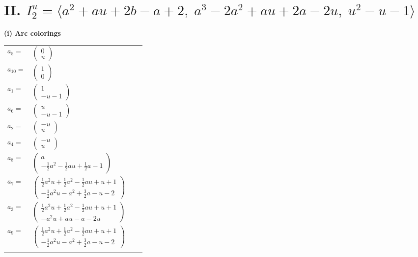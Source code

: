 \documentclass[1p]{elsarticle_modified}
\theoremstyle{definition}
\begin{document}
\centering \section*{II. $I^u_{2}= \langle a^2+a u+2 b- a+2,\;a^3-2 a^2+a u+2 a-2 u,\;u^2- u-1 \rangle$}
\flushleft \textbf{(i) Arc colorings}\\
\begin{tabular}{m{7pt} m{180pt} m{7pt} m{180pt} }
\flushright $a_{5}=$&$\begin{pmatrix}0\\u\end{pmatrix}$ \\
\flushright $a_{10}=$&$\begin{pmatrix}1\\0\end{pmatrix}$ \\
\flushright $a_{1}=$&$\begin{pmatrix}1\\- u-1\end{pmatrix}$ \\
\flushright $a_{6}=$&$\begin{pmatrix}u\\- u-1\end{pmatrix}$ \\
\flushright $a_{2}=$&$\begin{pmatrix}- u\\u\end{pmatrix}$ \\
\flushright $a_{4}=$&$\begin{pmatrix}- u\\u\end{pmatrix}$ \\
\flushright $a_{8}=$&$\begin{pmatrix}a\\-\frac{1}{2} a^2-\frac{1}{2} a u+\frac{1}{2} a-1\end{pmatrix}$ \\
\flushright $a_{7}=$&$\begin{pmatrix}\frac{1}{2} a^2 u+\frac{1}{2} a^2-\frac{1}{2} a u+u+1\\-\frac{1}{2} a^2 u- a^2+\frac{3}{2} a- u-2\end{pmatrix}$ \\
\flushright $a_{3}=$&$\begin{pmatrix}\frac{1}{2} a^2 u+\frac{1}{2} a^2-\frac{1}{2} a u+u+1\\- a^2 u+a u- a-2 u\end{pmatrix}$ \\
\flushright $a_{9}=$&$\begin{pmatrix}\frac{1}{2} a^2 u+\frac{1}{2} a^2-\frac{1}{2} a u+u+1\\-\frac{1}{2} a^2 u- a^2+\frac{3}{2} a- u-2\end{pmatrix}$\\&\end{tabular}
\end{document}
